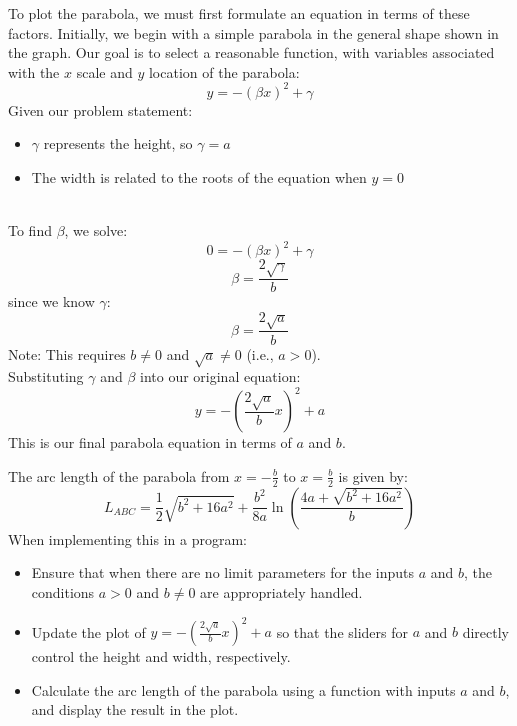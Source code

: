 \documentclass[a4paper, 12pt]{report}
\begin{document}
    To plot the parabola, we must first formulate an equation in terms of these factors. Initially, we begin with a simple parabola in the general shape shown in the graph. Our goal is to select a reasonable function, with variables associated with the $x$ scale and $y$ location of the parabola:    
    \[y = -(\beta x)^2 + \gamma\]
    Given our problem statement:\\
    \vspace{1em}
    \hspace{3.8em}
    \begin{minipage}{0.8\textwidth}\centering
       \begin{itemize}[itemsep=-0.1cm]
        \item $\gamma$ represents the height, so $\gamma = a$
        \item The width is related to the roots of the equation when $y = 0$
    \end{itemize}
    \end{minipage}\\
    \vspace{1em}
    To find $\beta$, we solve:
    \[0 = -(\beta x)^2 + \gamma\]
    \[\beta = \frac{2\sqrt{\gamma}}{b}\]
    since we know $\gamma$:
    \[\beta = \frac{2\sqrt{a}}{b}\]
    Note: This requires $b \neq 0$ and $\sqrt{a} \neq 0$ (i.e., $a > 0$).\\
    Substituting $\gamma$ and $\beta$ into our original equation:
    \[\boxed{y = -\left(\frac{2\sqrt{a}}{b}x\right)^2 + a}\]
    This is our final parabola equation in terms of $a$ and $b$.
    \newpage
    
    The arc length of the parabola from $x = -\frac{b}{2}$ to $x = \frac{b}{2}$ is given by:
    \[L_{ABC} = \frac{1}{2}\sqrt{b^2 + 16a^2} + \frac{b^2}{8a}\ln\left(\frac{4a + \sqrt{b^2 + 16a^2}}{b}\right)\]
    When implementing this in a program:
    \begin{itemize}[itemsep=-0.1cm]
        \item Ensure that when there are no limit parameters for the inputs \(a\) and \(b\), the conditions \(a > 0\) and \(b \neq 0\) are appropriately handled.
        \item Update the plot of \(y = -\left(\frac{2\sqrt{a}}{b}x\right)^2 + a\) so that the sliders for \(a\) and \(b\) directly control the height and width, respectively.
        \item Calculate the arc length of the parabola using a function with inputs \(a\) and \(b\), and display the result in the plot.
    \end{itemize}
    \raggedright
    
\end{document}
